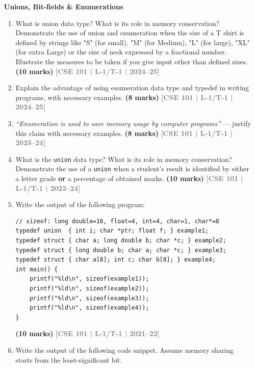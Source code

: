 \documentclass[12pt,a3paper]{article}
\newcommand{\yr}[1]{\hfill\textcolor{gray}{\small\textbf{[#1]}}}
\newcommand{\mk}[1]{\textcolor{orange!70!black}{\small\textbf{(#1 marks)}}}
\newcommand{\subtopic}[2]{%
  \vspace{10pt}
  \noindent\begin{tcolorbox}[colback=#1!8,colframe=#1,boxrule=0.6pt,arc=4pt,
    left=6pt,right=6pt,top=4pt,bottom=4pt]
    \small\bfseries\textcolor{#1}{#2}
  \end{tcolorbox}
  \vspace{2pt}
}
\begin{document}
\subtopic{cC}{Unions, Bit-fields \& Enumerations}
\label{sub:s6-union}

\begin{enumerate}

\item What is union data type? What is its role in memory conservation? Demonstrate the use of union and enumeration when the size of a T shirt is defined by strings like "S" (for small), "M" (for Medium), "L" (for large), "XL" (for extra Large) or the size of neck expressed by a fractional number. Illustrate the measures to be taken if you give input other than defined sizes.  
\mk{10} \yr{CSE 101 | L-1/T-1 | 2024--25}  

\item Explain the advantage of using enumeration data type and typedef in writing programs, with necessary examples.
\mk{8} \yr{CSE 101 | L-1/T-1 | 2024--25}  

\item \textit{``Enumeration is used to save memory usage by computer programs''} --- justify this claim with necessary examples.
\mk{8} \yr{CSE 101 | L-1/T-1 | 2023--24}

\item What is the \texttt{union} data type? What is its role in memory conservation? Demonstrate the use of a \texttt{union} when a student's result is identified by either a letter grade \textbf{or} a percentage of obtained marks.
\mk{10} \yr{CSE 101 | L-1/T-1 | 2023--24}

\item Write the output of the following program:
 
\begin{lstlisting}
// sizeof: long double=16, float=4, int=4, char=1, char*=8
typedef union  { int i; char *ptr; float f; } example1;
typedef struct { char a; long double b; char *c; } example2;
typedef struct { long double b; char a; char *c; } example3;
typedef struct { char a[8]; int c; char b[8]; } example4;
int main() {
    printf("%ld\n", sizeof(example1));
    printf("%ld\n", sizeof(example2));
    printf("%ld\n", sizeof(example3));
    printf("%ld\n", sizeof(example4));
}
\end{lstlisting}
\mk{10} \yr{CSE 101 | L-1/T-1 | 2021--22}


\item Write the output of the following code snippet. Assume memory sharing starts from the least-significant bit.
 

\end{enumerate}
\end{document}
